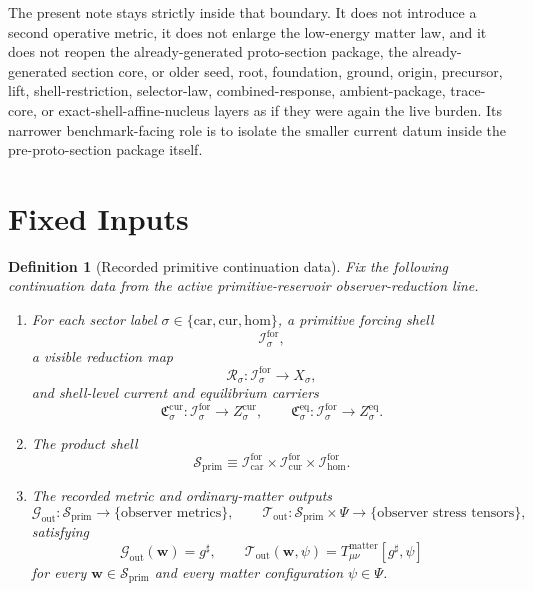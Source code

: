\documentclass[11pt]{article}
\newcommand{\CompletedMetric}{g^{\sharp}}
\newcommand{\MatterSpace}{\Psi}
\newcommand{\Car}{\mathrm{car}}
\newcommand{\Cur}{\mathrm{cur}}
\newcommand{\Hom}{\mathrm{hom}}
\newcommand{\ForSpace}[1]{\mathcal I_{#1}^{\mathrm{for}}}
\newcommand{\PrimShell}{\mathcal S_{\mathrm{prim}}}
\newcommand{\Reduction}[1]{\mathcal R_{#1}}
\newcommand{\CurrentCarrier}[1]{\mathfrak C_{#1}^{\mathrm{cur}}}
\newcommand{\EqCarrier}[1]{\mathfrak C_{#1}^{\mathrm{eq}}}
\newcommand{\MetricOut}{\mathscr G_{\mathrm{out}}}
\newcommand{\MatterOut}{\mathscr T_{\mathrm{out}}}
\newtheorem{definition}{Definition}
\begin{document}
The present note stays strictly inside that boundary. It does not introduce a second operative metric, it does not enlarge the low-energy matter law, and it does not reopen the already-generated proto-section package, the already-generated section core, or older seed, root, foundation, ground, origin, precursor, lift, shell-restriction, selector-law, combined-response, ambient-package, trace-core, or exact-shell-affine-nucleus layers as if they were again the live burden. Its narrower benchmark-facing role is to isolate the smaller current datum inside the pre-proto-section package itself.

\section{Fixed Inputs}

\begin{definition}[Recorded primitive continuation data]
\label{def:fixed}
Fix the following continuation data from the active primitive-reservoir observer-reduction line.
\begin{enumerate}
    \item For each sector label \(\sigma\in\{\Car,\Cur,\Hom\}\), a primitive forcing shell
    \[
    \ForSpace{\sigma},
    \]
    a visible reduction map
    \[
    \Reduction{\sigma}:\ForSpace{\sigma}\to X_{\sigma},
    \]
    and shell-level current and equilibrium carriers
    \[
    \CurrentCarrier{\sigma}:\ForSpace{\sigma}\to Z_{\sigma}^{\mathrm{cur}},
    \qquad
    \EqCarrier{\sigma}:\ForSpace{\sigma}\to Z_{\sigma}^{\mathrm{eq}}.
    \]
    \item The product shell
    \[
    \PrimShell
    \equiv
    \ForSpace{\Car}\times \ForSpace{\Cur}\times \ForSpace{\Hom}.
    \]
    \item The recorded metric and ordinary-matter outputs
    \[
    \MetricOut:\PrimShell\to\{\text{observer metrics}\},
    \qquad
    \MatterOut:\PrimShell\times\MatterSpace\to\{\text{observer stress tensors}\},
    \]
    satisfying
    \begin{equation}
    \MetricOut(\mathbf w)=\CompletedMetric,
    \qquad
    \MatterOut(\mathbf w,\psi)
    =
    T_{\mu\nu}^{\mathrm{matter}}[\CompletedMetric,\psi]
    \label{eq:fixedoutputs}
    \end{equation}
    for every \(\mathbf w\in\PrimShell\) and every matter configuration \(\psi\in\MatterSpace\).
\end{enumerate}
\end{definition}
\end{document}
